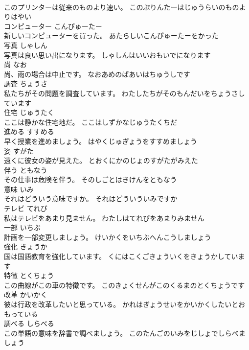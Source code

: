 \documentclass[8pt]{extreport}
\begin{document}
\begin{CJK}{UTF8}{min}
\\	このプリンターは従来のものより速い。	このぷりんたーはじゅうらいのものよりはやい	
\\	コンピューター	こんぴゅーたー	
\\	新しいコンピューターを買った。	あたらしいこんぴゅーたーをかった	
\\	写真	しゃしん	
\\	写真は良い思い出になります。	しゃしんはいいおもいでになります	
\\	尚	なお	
\\	尚、雨の場合は中止です。	なおあめのばあいはちゅうしです	
\\	調査	ちょうさ	
\\	私たちがその問題を調査しています。	わたしたちがそのもんだいをちょうさしています	
\\	住宅	じゅうたく	
\\	ここは静かな住宅地だ。	ここはしずかなじゅうたくちだ	
\\	進める	すすめる	
\\	早く授業を進めましょう。	はやくじゅぎょうをすすめましょう	
\\	姿	すがた	
\\	遠くに彼女の姿が見えた。	とおくにかのじょのすがたがみえた	
\\	伴う	ともなう	
\\	その仕事は危険を伴う。	そのしごとはきけんをともなう	
\\	意味	いみ	
\\	それはどういう意味ですか。	それはどういういみですか	
\\	テレビ	てれび	
\\	私はテレビをあまり見ません。	わたしはてれびをあまりみません	
\\	一部	いちぶ	
\\	計画を一部変更しましょう。	けいかくをいちぶへんこうしましょう	
\\	強化	きょうか	
\\	国は国語教育を強化しています。	くにはこくごきょういくをきょうかしています	
\\	特徴	とくちょう	
\\	この曲線がこの車の特徴です。	このきょくせんがこのくるまのとくちょうです	
\\	改革	かいかく	
\\	彼は行政を改革したいと思っている。	かれはぎょうせいをかいかくしたいとおもっている	
\\	調べる	しらべる	
\\	この単語の意味を辞書で調べましょう。	このたんごのいみをじしょでしらべましょう	

\end{CJK}
\end{document}
